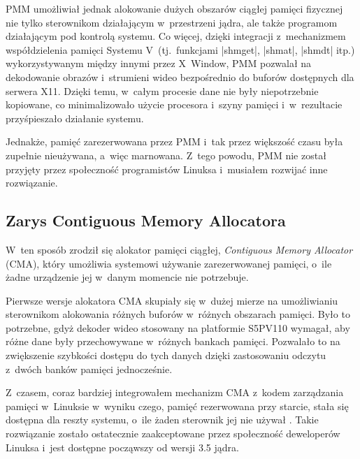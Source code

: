 PMM umożliwiał jednak alokowanie dużych obszarów ciągłej pamięci
fizycznej nie tylko sterownikom działającym w~przestrzeni jądra, ale
także programom działającym pod kontrolą systemu. Co więcej, dzięki
integracji z~mechanizmem współdzielenia pamięci Systemu
V~(tj.\ funkcjami \code|shmget|, \code|shmat|, \code|shmdt| itp.)
wykorzystywanym między innymi przez X~Window, PMM pozwalał na
dekodowanie obrazów i~strumieni wideo bezpośrednio do buforów
dostępnych dla serwera X11.  Dzięki temu, w~całym procesie dane nie
były niepotrzebnie kopiowane, co minimalizowało użycie procesora
i~szyny pamięci i~w~rezultacie przyśpieszało działanie systemu.

Jednakże, pamięć zarezerwowana przez PMM i~tak przez większość czasu
była zupełnie nieużywana, a~więc marnowana.  Z~tego powodu, PMM nie
został przyjęty przez społeczność programistów Linuksa i~musiałem
rozwijać inne rozwiązanie.

\subsection{Zarys Contiguous Memory Allocatora}

W~ten sposób zrodził się alokator pamięci ciągłej, {\it Contiguous
  Memory Allocator} (CMA), który umożliwia systemowi używanie
zarezerwowanej pamięci, o~ile żadne urządzenie jej w~danym momencie
nie potrzebuje.

Pierwsze wersje alokatora CMA skupiały się w~dużej mierze na
umożliwianiu sterownikom alokowania różnych buforów w~różnych
obszarach pamięci.  Było to potrzebne, gdyż dekoder wideo stosowany na
platformie S5PV110 wymagał, aby różne dane były przechowywane
w~różnych bankach pamięci.  Pozwalało to na zwiększenie szybkości
dostępu do tych danych dzięki zastosowaniu odczytu z~dwóch banków
pamięci jednocześnie.

Z~czasem, coraz bardziej integrowałem mechanizm CMA z~kodem
zarządzania pamięci w~Linuksie w~wyniku czego, pamięć rezerwowana przy
starcie, stała się dostępna dla reszty systemu, o~ile żaden sterownik
jej nie używał \autocite{patch:cma-24}.  Takie rozwiązanie zostało
ostatecznie zaakceptowane przez społeczność deweloperów Linuksa i~jest
dostępne począwszy od wersji 3.5 jądra.
